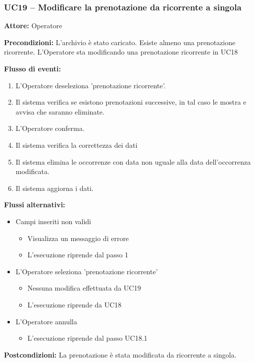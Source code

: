 \documentclass[a4paper,11pt]{article}
\begin{document}
\begin{samepage}
\subsubsection*{UC19 -- Modificare la prenotazione da ricorrente a singola}
\begin{ucbox}

\noindent\textbf{Attore:} Operatore\par
\noindent\textbf{Precondizioni:} L'archivio è stato caricato. Esiste almeno una prenotazione ricorrente. L'Operatore sta modificando una prenotazione ricorrente in UC18\par

\noindent\textbf{Flusso di eventi:}
\begin{enumerate}
\item L'Operatore deseleziona 'prenotazione ricorrente'. \item Il sistema verifica se esistono prenotazioni successive, in tal caso le mostra e avvisa che saranno eliminate. \item L'Operatore conferma. \item Il sistema verifica la correttezza dei dati \item Il sistema elimina le occorrenze con data non uguale alla data dell'occorrenza modificata. \item Il sistema aggiorna i dati. \end{enumerate}
\noindent\textbf{Flussi alternativi:}
\begin{itemize}
\item[1a.] Campi inseriti non validi
\begin{itemize}
\item Visualizza un messaggio di errore
\item L'esecuzione riprende dal passo 1
\end{itemize}
\item[1b.] L'Operatore seleziona 'prenotazione ricorrente'
\begin{itemize}
\item Nessuna modifica effettuata da UC19
\item L'esecuzione riprende da UC18
\end{itemize}
\item[3a.] L'Operatore annulla
\begin{itemize}
\item L'esecuzione riprende dal passo UC18.1
\end{itemize}
\end{itemize}
\noindent\textbf{Postcondizioni:} La prenotazione è stata modificata da ricorrente a singola.\par
\end{ucbox}
\end{samepage}
\end{document}
